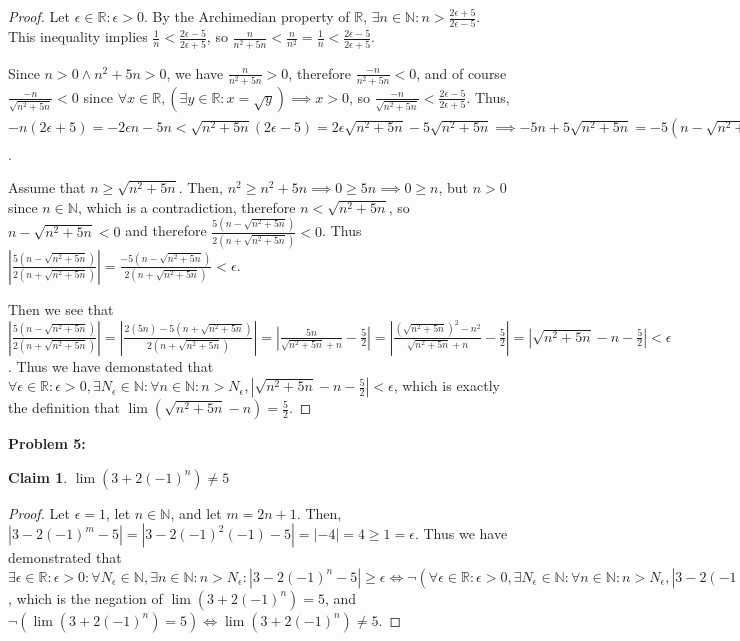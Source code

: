 \documentclass{article}
\newcommand{\reals}{\ensuremath{\mathbb{R}}}
\newcommand{\nats}{\ensuremath{\mathbb{N}}}
\newcommand{\eps}{\ensuremath{\epsilon}}
\newcommand{\neps}{\ensuremath{N_\epsilon}}
\newcommand{\overn}[1]{\ensuremath{\frac{#1}{n}}}
\newcommand{\dsn}{\sqrt{n^2 + 5n}}
\newtheorem{clm}{Claim}
\begin{document}
\begin{proof}
	Let $\eps \in \reals: \eps > 0$.
	By the Archimedian property of \reals,
	$\exists n \in \nats: n > \frac{2\eps + 5}{2\eps - 5}$.
	This inequality implies $\frac{1}{n} < \frac{2\eps - 5}{2\eps + 5}$,
	so $\frac{n}{n^2 + 5n} < \frac{n}{n^2} = \overn{1} < \frac{2\eps - 5}{2\eps + 5}$.

	Since $n > 0 \land n^2 +5n > 0$, we have $\frac{n}{n^2 + 5n} > 0$,
	therefore $\frac{-n}{n^2 + 5n} < 0$, and of course $\frac{-n}{\dsn} < 0$
	since $\forall x \in \reals, (\exists y \in \reals: x = \sqrt{y}) \implies x > 0$,
	so $\frac{-n}{\dsn} < \frac{2\eps - 5}{2\eps + 5}$.
	Thus, $-n(2\eps + 5) = -2\eps n -5n < \dsn(2\eps - 5) = 2\eps\dsn - 5\dsn
	\implies -5n + 5\dsn = -5(n - \dsn) < 2\eps\dsn + 2\eps n = 2\eps(n + \dsn)
	\implies \frac{-5(n - \dsn)}{2(n + \dsn)} < \eps$.
	
	Assume that $n \geq \dsn$.
	Then, $n^2 \geq n^2 + 5n \implies 0 \geq 5n \implies 0 \geq n$,
	but $n > 0$ since $n \in \nats$, which is a contradiction,
	therefore $n < \dsn$, so $n - \dsn < 0$ and therefore $\frac{5(n - \dsn)}{2(n + \dsn)} < 0$.
	Thus  $|\frac{5(n - \dsn)}{2(n + \dsn)}| = \frac{-5(n - \dsn)}{2(n + \dsn)} < \eps$.

	Then we see that $|\frac{5(n - \dsn)}{2(n + \dsn)}| = |\frac{2(5n) - 5(n + \dsn)}{2(n + \dsn)}|
	= |\frac{5n}{\dsn + n} - \frac{5}{2}| = |\frac{(\dsn)^2 - n^2}{\dsn + n} - \frac{5}{2}|
	= |\dsn - n - \frac{5}{2}| < \eps$.
	Thus we have demonstated that $\forall \eps \in \reals : \eps > 0, \exists \neps \in \nats:
	\forall n \in \nats: n > \neps,
	|\dsn - n - \frac{5}{2}| < \eps$,
	which is exactly the definition that
	$\lim(\dsn - n) = \frac{5}{2}$.
\end{proof}

\textbf{Problem 5:}

\begin{clm} \label{clm}
	$\lim(3 + 2(-1)^n) \neq 5$
\end{clm}

\begin{proof}
	Let $\eps = 1$, let $n \in \nats$, and let $m = 2n + 1$.
	Then, $|3 - 2(-1)^m - 5| = |3 - 2(-1)^2(-1) - 5| =
	|-4| = 4 \geq 1 = \eps$.
	Thus we have demonstrated that $\exists \eps \in \reals : \eps > 0 : \forall N_\eps \in \nats,
	\exists n \in \nats: n > N_\eps: |3 - 2(-1)^n - 5| \geq \eps
	\iff \neg(\forall \eps \in \reals : \eps > 0, \exists \neps \in \nats:
	\forall n \in \nats: n > \neps, | 3 -2(-1)^n - 5| < \eps)$,
	which is the negation of
	$\lim(3 + 2(-1)^n) = 5$,
	and
	$\neg(\lim(3 + 2(-1)^n) = 5) \iff \lim(3 + 2(-1)^n) \neq 5$.

\end{proof}
\end{document}
